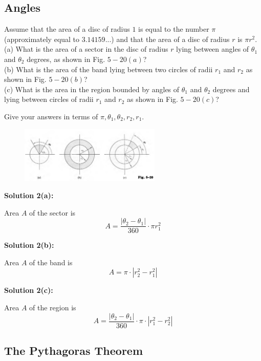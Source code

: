 \subsection{Angles}

\begin{tcolorbox}[title=Problem 2, breakable]
    Assume that the area of a disc of radius $1$ is equal to the 
    number $\pi$ (approximately equal to $3.14159$...) and that 
    the area of a disc of radius $r$ is $\pi r^2$. \\

    (a) What is the area of a sector in the disc of radius $r$ lying
        between angles of $\theta_1$ and $\theta_2$ degrees, as shown
        in Fig. $5-20 (a)$? \\

    (b) What is the area of the band lying between two circles of radii 
        $r_1$ and $r_2$ as shown in Fig. $5-20 (b)$? \\

    (c) What is the area in the region bounded by angles of $\theta_1$
        and $\theta_2$ degrees and lying between circles of radii $r_1$
        and $r_2$ as shown in Fig. $5-20 (c)$?

    Give your answers in terms of $\pi, \theta_1, \theta_2, r_2, r_1$.
\end{tcolorbox}

\begin{figure}[h]
    \centering
    \includegraphics[width=0.6\textwidth]{images/5_2.png}
\end{figure}

\textbf{Solution 2(a):}

Area $A$ of the sector is 
\[A = \frac{|\theta_2 - \theta_1|}{360} \cdot \pi r_1^2\]

\textbf{Solution 2(b):}

Area $A$ of the band is
\[A = \pi \cdot |r_2^2 - r_1^2|\]

\textbf{Solution 2(c):}

Area $A$ of the region is
\[A = \frac{|\theta_2 - \theta_1|}{360}  \cdot \pi \cdot |r_1^2 - r_2^2|\]

\subsection{The Pythagoras Theorem}

